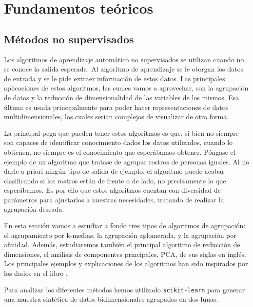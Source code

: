 \chapter{Fundamentos teóricos} \label{chap:fundamentos-teoricos}

\section{Métodos no supervisados}

Los algoritmos de aprendizaje automático no supervisados se utilizan cuando no se conoce la salida esperada. Al algoritmo de aprendizaje se le otorgan los datos de entrada y se le pide extraer información de estos datos. Las principales aplicaciones de estos algoritmos, las cuales vamos a aprovechar, son la agrupación de datos y la reducción de dimensionalidad de las variables de los mismos. Esa última es usada principalmente para poder hacer representaciones de datos multidimensionales, los cuales serian complejos de visualizar de otra forma.

La principal pega que pueden tener estos algoritmos es que, si bien no siempre son capaces de identificar conocimiento dados los datos utilizados, cuando lo obtienen, no siempre es el conocimiento que esperábamos obtener. Póngase el ejemplo de un algoritmo que tratase de agrupar rostros de personas iguales. Al no darle a priori ningún tipo de salida de ejemplo, el algoritmo puede acabar clasificando si los rostros están de frente o de lado, no precisamente lo que esperábamos. Es por ello que estos algoritmos cuentan con diversidad de parámetros para ajustarlos a nuestras necesidades, tratando de realizar la agrupación deseada.

En esta sección vamos a estudiar a fondo tres tipos de algoritmos de agrupación: el agrupamiento por k-medias, la agrupación aglomerada, y la agrupación por afinidad. Además, estudiaremos también el principal algoritmo de reducción de dimensiones, el análisis de componentes principales, PCA, de sus siglas en inglés. Los principales ejemplos y explicaciones de los algoritmos han sido inspirados por los dados en el libro \cite[Introduction to Machine Learning with Python]{machine}.

Para analizar los diferentes métodos hemos utilizado \texttt{scikit-learn} para generar una muestra sintética de datos bidimensionales agrupados en dos lunas.


